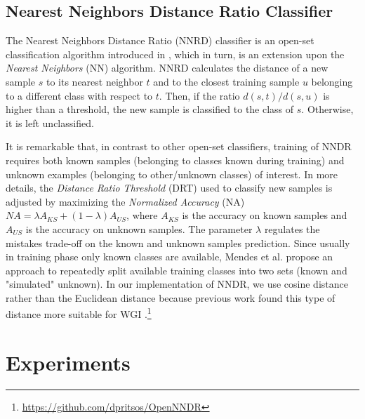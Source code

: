 \subsection{Nearest Neighbors Distance Ratio Classifier}\label{sec:NNRD_Description}

The Nearest Neighbors Distance Ratio (NNRD) classifier is an open-set classification algorithm introduced in \cite{mendesjunior2016}, which in turn, is an extension upon the \textit{Nearest Neighbors} (NN) algorithm. NNRD calculates the distance of a new sample $s$ to its nearest neighbor $t$ and to the closest training sample $u$ belonging to a different class with respect to $t$. Then, if the ratio $d(s,t)/d(s,u)$ is higher than a threshold, the new sample is classified to the class of $s$. Otherwise, it is left unclassified. 

It is remarkable that, in contrast to other open-set classifiers, training of NNDR requires both known samples (belonging to classes known during training) and unknown examples (belonging to other/unknown classes) of interest. In more details, the \textit{Distance Ratio Threshold} (DRT) used to classify new samples is adjusted by maximizing the \textit{Normalized Accuracy} (NA)  $NA = \lambda A_{KS} + (1 - \lambda) A_{US}$, where $A_{KS}$ is the accuracy on known samples and $A_{US}$ is the accuracy on unknown samples. The parameter $\lambda$ regulates the mistakes trade-off on the known and unknown samples prediction. Since usually in training phase only known classes are available, Mendes et al. \cite{mendesjunior2016} propose an approach to repeatedly split available training classes into two sets (known and "simulated" unknown). In our implementation of NNDR, we use cosine distance rather than the Euclidean distance because previous work found this type of distance more suitable for WGI \cite{pritsos2018open}.\footnote{\url{https://github.com/dpritsos/OpenNNDR}}

\section{Experiments}\label{sec:experiments}


